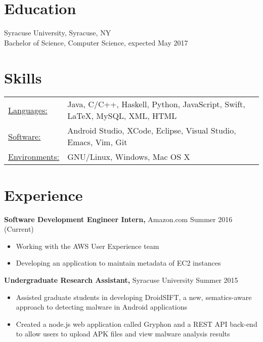 \documentclass[margin]{res}
\begin{document}
 

 
\address{ \\ 201 Harvard Place \\ Syracuse, NY 13210  \\
        (336)-540-4956 }
\address{ \\ mlburggr@syr.edu \\ github.com/mlburggr }

 
\begin{resume} 
 

\section{Education} 
 Syracuse University, Syracuse, NY  \\        
    Bachelor of Science, Computer Science, expected May 2017 

\section{Skills}
   \begin{tabular}{l p{3in}}
    \underline{Languages:} & Java, C/C++, Haskell, Python, JavaScript, Swift, \LaTeX , MySQL, XML, HTML \\
     \underline{Software:} & Android Studio, XCode, Eclipse, Visual Studio, Emacs, Vim, Git  \\
     \underline{Environments:} & GNU/Linux, Windows, Mac OS X
     
 \end{tabular}    
 

\section{Experience}
{\bf Software Development Engineer Intern,} Amazon.com \hfill Summer 2016 (Current)
\begin{itemize} \itemsep -2pt
\item Working with the AWS User Experience team
\item Developing an application to maintain metadata of EC2 instances
\end{itemize}

 {\bf Undergraduate Research Assistant,} Syracuse University \hfill Summer  2015
 \begin{itemize} \itemsep -2pt  %
 \item Assisted graduate students in developing DroidSIFT, a new, sematics-aware approach to detecting malware in Android applications
 \item Created a node.js web application called Gryphon and a REST API back-end to allow users to upload APK files and view malware analysis results
 \end{itemize}
 

\end{resume}
\end{document}
